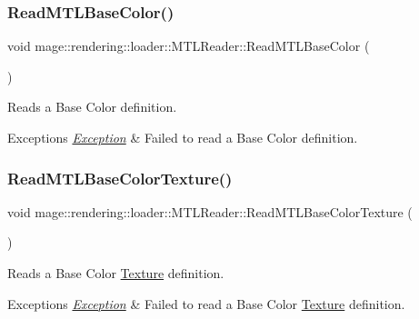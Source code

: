 \subsubsection{\texorpdfstring{Read\+M\+T\+L\+Base\+Color()}{ReadMTLBaseColor()}}
{\footnotesize\ttfamily void mage\+::rendering\+::loader\+::\+M\+T\+L\+Reader\+::\+Read\+M\+T\+L\+Base\+Color (\begin{DoxyParamCaption}{ }\end{DoxyParamCaption})\hspace{0.3cm}{\ttfamily [private]}}

Reads a Base Color definition.


\begin{DoxyExceptions}{Exceptions}
{\em \mbox{\hyperlink{classmage_1_1_exception}{Exception}}} & Failed to read a Base Color definition. \\
\hline
\end{DoxyExceptions}
\mbox{\label{classmage_1_1rendering_1_1loader_1_1_m_t_l_reader_a67198ee5158ee7d77e907f6538030aee}} 
\subsubsection{\texorpdfstring{Read\+M\+T\+L\+Base\+Color\+Texture()}{ReadMTLBaseColorTexture()}}
{\footnotesize\ttfamily void mage\+::rendering\+::loader\+::\+M\+T\+L\+Reader\+::\+Read\+M\+T\+L\+Base\+Color\+Texture (\begin{DoxyParamCaption}{ }\end{DoxyParamCaption})\hspace{0.3cm}{\ttfamily [private]}}

Reads a Base Color \mbox{\hyperlink{classmage_1_1rendering_1_1_texture}{Texture}} definition.


\begin{DoxyExceptions}{Exceptions}
{\em \mbox{\hyperlink{classmage_1_1_exception}{Exception}}} & Failed to read a Base Color \mbox{\hyperlink{classmage_1_1rendering_1_1_texture}{Texture}} definition. \\
\hline
\end{DoxyExceptions}
\mbox{\label{classmage_1_1rendering_1_1loader_1_1_m_t_l_reader_ab123422945f5937ffe484c1076a6858b}} 
